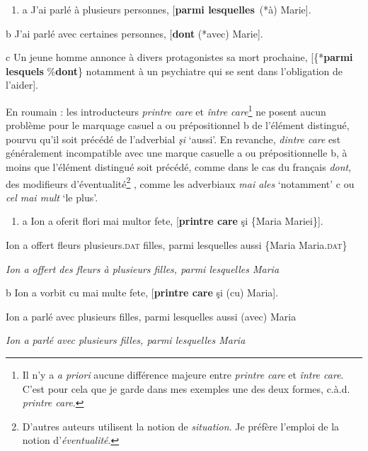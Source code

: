 \begin{enumerate}
\item \label{bkm:Ref292976815}a  J'ai parlé à plusieurs personnes, [\textbf{parmi lesquelles}~(*à) Marie].


\end{enumerate}
  b  J'ai parlé avec certaines personnes, [\textbf{dont} (*avec) Marie].

  c  Un jeune homme annonce à divers protagonistes sa mort prochaine, [\{*\textbf{parmi lesquels} {\textbar} \%\textbf{dont}\} notamment à un psychiatre qui se sent dans l'obligation de l'aider]. 

En roumain : les introducteurs \textit{printre care} et \textit{între care}\footnote{Il n'y a \textit{a priori} aucune différence majeure entre \textit{printre care} et \textit{între care}. C'est pour cela que je garde dans mes exemples une des deux formes, c.à.d. \textit{printre care}. }   ne posent aucun problème pour le marquage casuel a ou prépositionnel b de l'élément distingué, pourvu qu'il soit précédé de l'adverbial \textit{şi} `aussi'. En revanche, \textit{dintre care} est généralement incompatible avec une marque casuelle a ou prépositionnelle b, à moins que l'élément distingué soit précédé, comme dans le cas du français \textit{dont}, des modifieurs d'éventualité\footnote{D'autres auteurs utilisent la notion de \textit{situation}.  Je préfère l'emploi de la notion d'\textit{éventualité}.  } , comme les adverbiaux \textit{mai ales} `notamment' c ou \textit{cel mai mult} `le plus'.


\begin{enumerate}
\item \label{bkm:Ref292979888}a  Ion a oferit flori mai multor fete, [\textbf{printre care} şi \{Maria {\textbar} Mariei\}]. 


\end{enumerate}
  Ion a offert fleurs plusieurs\textsc{.dat} filles, parmi lesquelles aussi \{Maria {\textbar} Maria.\textsc{dat}\} 

  \textit{Ion a offert des fleurs à plusieurs filles, parmi lesquelles Maria} 

  b  Ion a vorbit cu mai multe fete, [\textbf{printre care} şi (cu) Maria].

    Ion a parlé avec plusieurs filles, parmi lesquelles aussi (avec) Maria

    \textit{Ion a parlé avec plusieurs filles, parmi lesquelles Maria}


